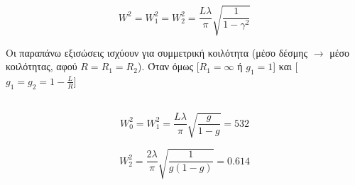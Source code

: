 \documentclass[a4paper,11pt,titlepage]{article}
\begin{document}
\begin{equation}
 W^2=W_1^2=W_2^2=\frac{L\lambda}{\pi}\sqrt{\dfrac{1}{1-\gamma^2}}
\end{equation}

Οι παραπάνω εξισώσεις ισχύουν για συμμετρική κοιλότητα (μέσο δέσμης $\rightarrow$ μέσο κοιλότητας, αφού $R=R_1=R_2$). 
Όταν όμως [$R_1=\infty$ ή $g_1=1$] και [$g_1=g_2=1-\frac{L}{R}$]
\\\\
\begin{minipage}{0.5\linewidth} 
\begin{equation} 
 W_0^2=W_1^2=\frac{L\lambda}{\pi}\sqrt{\frac{g}{1-g}}=532
\end{equation} 
\end{minipage} 
\hspace{0.5cm} 
\begin{minipage}{0.5\linewidth} 
\begin{equation} 
 W_2^2=\frac{2\lambda}{\pi}\sqrt{\frac{1}{g(1-g)}}=0.614
\end{equation} 
\end{minipage}







\end{document}
